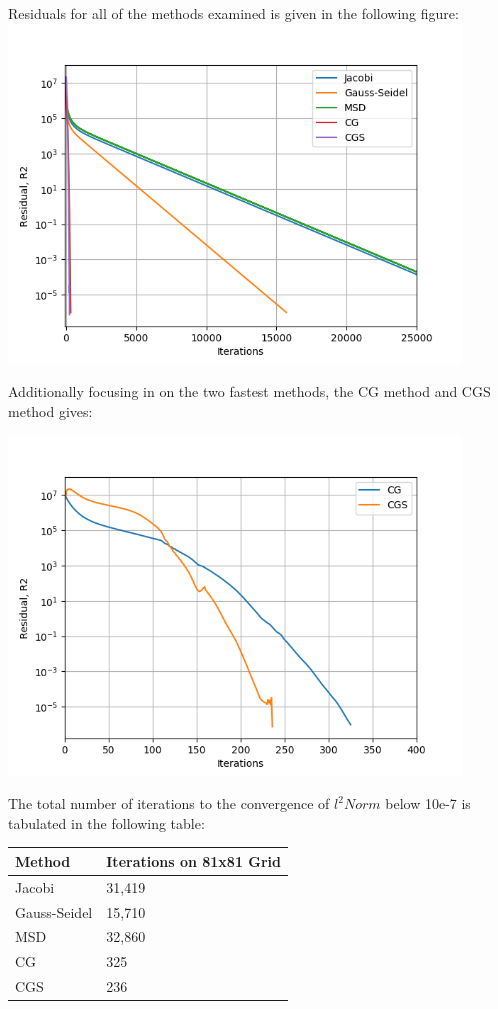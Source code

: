 \documentclass[11pt]{article}
\begin{document}
Residuals for all of the methods examined is given in the following figure:
\includegraphics[width=12cm]{./figures/residual1.png}

Additionally focusing in on the two fastest methods, the CG method and CGS method gives:

\includegraphics[width=12cm]{./figures/residual2.png}

The total number of iterations to the convergence of $l^{2}Norm$ below 10e-7 is tabulated in the following table:
\begin{center}
\begin{tabular}{ll}
\hline
Method & Iterations on 81x81 Grid\\
\hline
Jacobi & 31,419\\
Gauss-Seidel & 15,710\\
MSD & 32,860\\
CG & 325\\
CGS & 236\\
\hline
\end{tabular}
\end{center}
\end{document}
